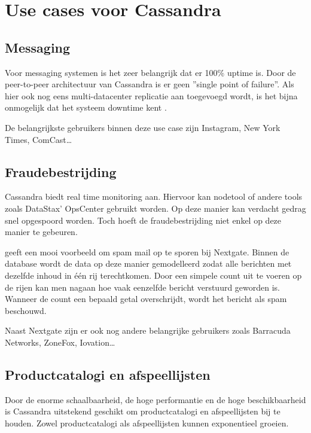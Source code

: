 \chapter{Use cases voor Cassandra}
\label{ch:cassandra_ucs}

\section{Messaging}
Voor messaging systemen is het zeer belangrijk dat er 100\% uptime is.
Door de peer-to-peer architectuur van Cassandra is er geen ''single point of failure''.
Als hier ook nog eens multi-datacenter replicatie aan toegevoegd wordt, is het bijna onmogelijk dat het systeem downtime kent \citep{Chan2014Messaging}.

De belangrijkste gebruikers binnen deze use case zijn Instagram, New York Times, ComCast\dots

\section{Fraudebestrijding}
Cassandra biedt real time monitoring aan.
Hiervoor kan nodetool of andere tools zoals DataStax' OpsCenter gebruikt worden.
Op deze manier kan verdacht gedrag snel opgespoord worden.
Toch hoeft de fraudebestrijding niet enkel op deze manier te gebeuren.

\cite{Nguyen2014Fraud} geeft een mooi voorbeeld om spam mail op te sporen bij Nextgate.
Binnen de database wordt de data op deze manier gemodelleerd zodat alle berichten met dezelfde inhoud in één rij terechtkomen.
Door een simpele count uit te voeren op de rijen kan men nagaan hoe vaak eenzelfde bericht verstuurd geworden is.
Wanneer de count een bepaald getal overschrijdt, wordt het bericht als spam beschouwd.

Naast Nextgate zijn er ook nog andere belangrijke gebruikers zoals Barracuda Networks, ZoneFox, Iovation\dots

\section{Productcatalogi en afspeellijsten}
Door de enorme schaalbaarheid, de hoge performantie en de hoge beschikbaarheid is Cassandra uitstekend geschikt om productcatalogi en afspeellijsten bij te houden.
Zowel productcatalogi als afspeellijsten kunnen exponentieel groeien.

